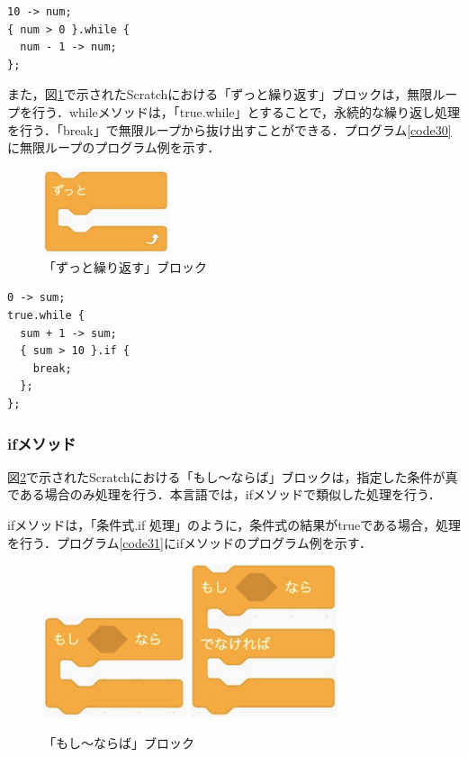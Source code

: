 \documentclass[10pt,a4j]{ltjsarticle}
\begin{document}
\begin{lstlisting}[caption=whileメソッドのプログラム例, label=code29]
10 -> num;
{ num > 0 }.while {
  num - 1 -> num;
};
\end{lstlisting}

また，図\ref{fig:while}で示されたScratchにおける「ずっと繰り返す」ブロックは，無限ループを行う．whileメソッドは，「true.while」とすることで，永続的な繰り返し処理を行う．「break」で無限ループから抜け出すことができる．プログラム\ref{code30}に無限ループのプログラム例を示す．

\begin{figure}[H]
  \centering
  \includegraphics[height=25mm]{images/truewhile.pdf} 
  \caption{「ずっと繰り返す」ブロック}
  \label{fig:while}
\end{figure}

\begin{lstlisting}[caption=無限ループのプログラム例, label=code30]
0 -> sum;
true.while {
  sum + 1 -> sum;
  { sum > 10 }.if {
    break;
  };
};
\end{lstlisting}
\subsubsection{ifメソッド}
図\ref{fig:if}で示されたScratchにおける「もし〜ならば」ブロックは，指定した条件が真である場合のみ処理を行う．本言語では，ifメソッドで類似した処理を行う．

ifメソッドは，「条件式.if 処理」のように，条件式の結果がtrueである場合，処理を行う．プログラム\ref{code31}にifメソッドのプログラム例を示す．

\begin{figure}[H]
  \centering
  \includegraphics[height=30mm]{images/if.pdf}
  \includegraphics[height=45mm]{images/if2.pdf} 
  \caption{「もし〜ならば」ブロック}
  \label{fig:if}
\end{figure}
\end{document}
